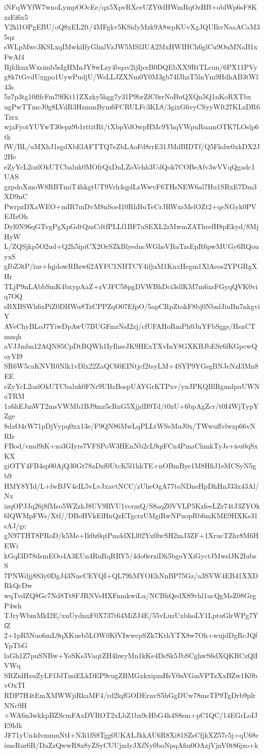 iNFqWYfW7wnoLympOOcEe/qx5XpvRXceUZY0dHWmRqOzHB+oblWp6sF8KzzEi6x5
Y2kl1OPgEBU/oQ8xEL2ft/4MFgkv5KSidyMzk9A8wpKUvXgJQUIhvNaaACaM35qz
sWLpMwc3KSLxqIMwkiIfyGlmlVzJW5MSl3UA2MxHWIHCh6glCu9OuMNaB1xFwAf4
BjfdknxWxsimb5sIgHMnJY8wLzy4bqav2ijIjcsB0DQEbXX9RtTLcun/6PX11PVy
g8k7tGvdUxgpo1UywPudjU/WsLLJZXNm0Y0M3gb74fJhzT5lnYm9HdhAB3tWl43s
5z7p3tg10flfcFm79fKt11ZXzky5hgg7y31P9brZfC0rrNoBuQXQn5Q1nKoRXTbx
ugPwTTmcJ0g8LVdR3HzmmBym6FCRULFc3KL8/3gixG6vyCSyyWft27KLzDR6Tzrx
wjaFyotYUYwT30epz9b1rttitRt/tXbpVdOwpHMc9YhqVWpuRuamOTK7LOslp6tk
fW/BL/uMXhJ1sgdXbElAFTTQ7eZbLAoFd8rrE31JMdBIDTf/Q5Fkdw0xkDX2J2He
eZyYcL2ozlOkUTCbaluk0MOfrQxDnLZoVchh3UdQok7COBeAfv3wVVqQgadc1UAS
gzpdoXmoW8RBTmiT4hkgtUT9Vrh4qplLzWwvF6THsNEW6al7Hu1SRxE7Dm3XD9nC
PwrpzDXaWEO+mIR7mDvM8nSoeI10RhBuTeCrJRWxsMelOZt2+qeNGyk0PVEJIzOh
Dyl0N96qGTvgPgXpGdtQmCdtfPLLf1BF7uSEXL2zMwmZAThrefH8pEkyd/8MjHyW
L/ZQSjkp5O2ud+Q2h5ipiCX2OrSZkBlyeducWGheVRuTzsEpR6pwMUGy6RQouyxS
gIbZ3tP/iur+fqjdowRBzw62AYFC1NHTCY4ifjuM1KnxHegm1XlAeos2YPGRgXHr
TLjP9nLAbbSmK4bxypAaZ+zVJFC58pgDVWBhDci3sllKM7m6xsFGyqQVK0viq7OQ
sBXBSWh6xPiZ0DHWu8TzCPPZqO07EfpO/5apCRpZtokF8bj0NbnlJiuBn7nkgviY
AVeChyBLoJ7YiwDpAwU7BUGFmrNsI2zj/cfUFAHoRmPh0JnYFbSggs/HsnCTmnqh
aVJJmbn12AQN85CpDtBQWh1IyIhseJK9HExTXvInY8GXKBJbESr6fKGpcwQoyYI9
SR6W5caKNVR0Nlk1vDlx22ZaQC60EINtjcf2tsyLM+4SYP9YGsgBNJeNzI3Mn8EE
eZyYcL2ozlOkUTCbaluk0FNr9UBzBospUAYGrKTPxv/ynJPKQBlRgmdpuUWNaTRM
1a6hEJmWT2msVWMb1BJ9mz5cRuG5XjjdB9Td/t0zU+6bpAgZcr/t0I4WjTypYZge
8daO4rW71pDjVypq0xx13e/F9QN86MwLqPLLtWSeMuJ0x/TWwuffvlwzp66vNRIr
FBod/vmd9iK+zo3GIyrs7VFSPoW3HEnNb2cL9qiFCn4PmaChmkTyJs+isu0qSxKX
giOTY4FB4sp00AjQ30Gt78aDzf0UtcK5l1hkTE+nOBmBye1M8HfiJ1eMCSyN5gb9
HMY8YId/L+fwBJV4eIL5vLvJxavtNCC/zUheOgA77toNDneHpDhHnJ33x43Al/Nx
izqOPJJq26j8fMso5WZzkJ8UV9RVU1vcrmQ/S8aqZ0VVLP5KzfeeLZr74tJ3ZYOk
6lQWMpFWs/Xtf//DBoHVkElHnQzETgcrzUMgiRwNPuopRb6mKME9HXKs31sAJ/gc
gN97THT8PRoD/k5Me+Ik0z0qtPmddXLl02Yx0lwSH2mJ3ZF+1XrucTZhr8M6HEWi
kGqI3D78dsmEOo4A3EUn4RuRqRRY5/4do0erziDh5bgoYXiGyctJMwslJK2IubsS
7PNWdjj883y0DgJ43NncCEYQI+QL79hMYOEhNnBP75Gz/a3SVW4EB41XXDRkQcDw
wqTvdZQ8Gc7Nd8Tt8FJRNVeHXFnmkwiLu/NCBhQedX89vhl1ucQgMsZ08GrgP4wh
TJryWbmMkI2E/xuUydnxF0X737t64MiZJ4E/55vLuzUxbhoLY1LptuGlrWPg7YfZ
2+1pR5Nuo6mL9qXKueb5LOW0KfVIwwcpSZk7KthYTX8w7Oh+wujdDgRcJQfYpTbG
laGh1Z7puSNBw+YeSKs3VaqtZH4hwyMn1kKe4DsSk5JbSCghwS6dXQKRCzQlIVWq
SRZidHzuZyLFfJdTmiELkDEP9cugZBMGxkxipmHsY0nVGmVPTzXxBZw1K0bvOxTI
RDP7H4tEmXMWWjiRkaMF4/rd2lqfGODErnvS5hGgDUw78meTP9TgDrb9plrNNc9H
+WA6n3wkkpBZScmFAxDVROT2xLbZ1bx9cHbG4h4S8sm+pC1QC/14EGrLoIJE9ldk
JF71yUn4dvmmuNtI+N3i1fS8Tgg0UKALJkkAU6R8Xi81SZsCfjkXZ57c5j+qU68c
imeRur6R/DaZzQwwR8x8yZSyCUUjxdyJXfNy0boNpqAfiu0OAzjVjnV0t86jzo+k
